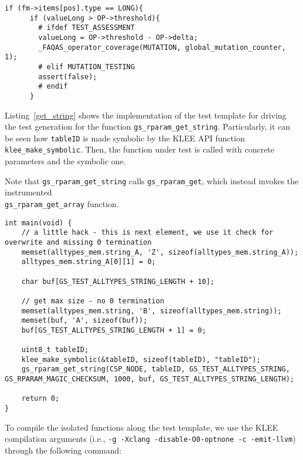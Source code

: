 \begin{lstlisting}[style=CStyle, float=t, caption=\_FAQAS\_mutate excerpt., label=assert]
if (fm->items[pos].type == LONG){
      if (valueLong > OP->threshold){
      	# ifdef TEST_ASSESSMENT
        valueLong = OP->threshold - OP->delta;
        _FAQAS_operator_coverage(MUTATION, global_mutation_counter, 1); 
        # elif MUTATION_TESTING
        assert(false);
        # endif
      }
\end{lstlisting}

Listing~\ref{get_string} shows the implementation of the test template for driving the test generation for the function \texttt{gs\_rparam\_get\_string}. Particularly, it can be seen how \texttt{tableID} is made symbolic by the KLEE API function \texttt{klee\_make\_symbolic}. Then, the function under test is called with concrete parameters and the symbolic one.

Note that \texttt{gs\_rparam\_get\_string} calls \texttt{gs\_rparam\_get}, which instead invokes the instrumented \\
\texttt{gs\_rparam\_get\_array} function.

\begin{lstlisting}[style=CStyle,float=t, caption=Test template for function gs\_rparam\_get\_string., label=get_string]
int main(void) {
    // a little hack - this is next element, we use it check for overwrite and missing 0 termination
    memset(alltypes_mem.string_A, 'Z', sizeof(alltypes_mem.string_A));
    alltypes_mem.string_A[0][1] = 0;

    char buf[GS_TEST_ALLTYPES_STRING_LENGTH + 10];

    // get max size - no 0 termination
    memset(alltypes_mem.string, 'B', sizeof(alltypes_mem.string));
    memset(buf, 'A', sizeof(buf));
    buf[GS_TEST_ALLTYPES_STRING_LENGTH + 1] = 0;

    uint8_t tableID;
    klee_make_symbolic(&tableID, sizeof(tableID), "tableID");
    gs_rparam_get_string(CSP_NODE, tableID, GS_TEST_ALLTYPES_STRING, GS_RPARAM_MAGIC_CHECKSUM, 1000, buf, GS_TEST_ALLTYPES_STRING_LENGTH);

    return 0;
}
\end{lstlisting}

To compile the isolated functions along the test template, we use the KLEE compilation arguments (i.e., \texttt{-g -Xclang -disable-O0-optnone -c -emit-llvm}) through the following command:

